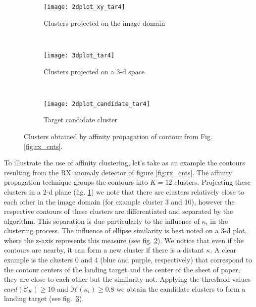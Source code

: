 \begin{figure}[h]
    \centering
    \begin{subfigure}[b]{0.45\textwidth}
        \texttt{[image: 2dplot\_xy\_tar4]}
        \caption{Clusters projected on the image domain}
        \label{fig:2dplot}
    \end{subfigure}
    ~ %
    \begin{subfigure}[b]{0.45\textwidth}
        \texttt{[image: 3dplot\_tar4]}
        \caption{Clusters projected on a 3-d space}
        \label{fig:3dplot}
    \end{subfigure}
    ~ %
    \begin{subfigure}[b]{0.45\textwidth}
        \texttt{[image: 2dplot\_candidate\_tar4]}
        \caption{Target candidate cluster}
        \label{fig:candidate}
    \end{subfigure}
   \caption{Clusters obtained by affinity propagation of contour from Fig. \ref{fig:rx_cnts}.}\label{fig:grouping_process}
\end{figure}

To illustrate the use of affinity clustering, let's take as an example the contours resulting from the RX anomaly detector of figure \ref{fig:rx_cnts}. The affinity propagation technique groups the contours into $K=12$ clusters. Projecting these clusters in a 2-d plane (fig. \ref{fig:2dplot}) we note that there are clusters relatively close to each other in the image domain (for example cluster 3 and 10), however the respective contours of these clusters are differentiated and separated by the algorithm. This separation is due particularly to the influence of $\kappa_{i}$ in the clustering process. The influence of ellipse similarity is best noted on a 3-d plot, where the z-axis represents this measure (see fig. \ref{fig:3dplot}). We notice that even if the contours are nearby, it can form a new cluster if there is a distant $\kappa$. A clear example is the clusters 0 and 4 (blue and purple, respectively) that correspond to the contour centers of the landing target and the center of the sheet of paper, they are close to each other but the similarity not. Applying the threshold values $card(\mathcal{C}_{K})\geq 10$ and $\mathcal{H}(\kappa_{i})\geq 0.8$ we obtain the candidate clusters to form a landing target (see fig.~\ref{fig:candidate}). 

